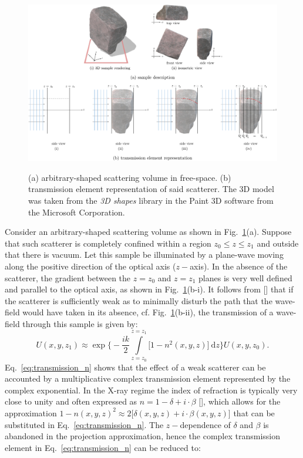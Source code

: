\begin{refsection}
\begin{figure}[t]
    \centering
    {\includegraphics[width=1.0\linewidth]{figures/compressed/projection_approx.pdf}}
    \caption[Transmission elements]{(a) arbitrary-shaped scattering volume in free-space. (b) transmission element representation of said scatterer. The 3D model was taken from the \textit{3D shapes} library in the Paint 3D software from the Microsoft Corporation.}
    \label{fig:projection}
\end{figure}
Consider an arbitrary-shaped scattering volume as shown in Fig.~\ref{fig:projection}(a). Suppose that such scatterer is completely confined within a region $z_0\leq z\leq z_1$ and outside that there is vacuum. Let this sample be illuminated by a plane-wave moving along the positive direction of the optical axis ($z-$axis). In the absence of the scatterer, the gradient between the $z=z_0$ and $z=z_1$ planes is very well defined and parallel to the optical axis, as shown in Fig.~\ref{fig:projection}(b-$\mathrm{i}$). It follows from [\cite[\textit{§2.2}]{Paganin2006}] that if the scatterer is sufficiently weak as to minimally disturb the path that the wave-field would have taken in its absence, cf. Fig.~\ref{fig:projection}(b-$\mathrm{ii}$), the transmission of a wave-field through this sample is given by:
\begin{equation}\label{eq:transmission_n}
    U(x,y,z_1)\approx\exp\Bigg\{-\frac{ik}{2}\int\limits_{z=z_0}^{z=z_1}{\big[1-n^2(x,y,z)\big]~\mathrm{d}z}\Bigg\}U(x,y,z_0).
\end{equation}{}
Eq.~\ref{eq:transmission_n} shows that the effect of a weak scatterer can be accounted by a multiplicative complex transmission element represented by the complex exponential. In the X-ray regime the index of refraction is typically very close to unity and often expressed as $n=1-\delta+i\cdot\beta$ [\cite[\textit{§1.6}]{Als-Nielsen2011}], which allows for the approximation $1-n(x,y,z)^2\approx2\big[\delta(x,y,z)+i\cdot\beta(x,y,z)\big]$ that can be substituted in Eq.~\ref{eq:transmission_n}. The $z-$dependence of $\delta$ and $\beta$ is abandoned in the projection approximation, hence the complex transmission element in Eq.~\ref{eq:transmission_n} can be reduced to:

\end{refsection}
